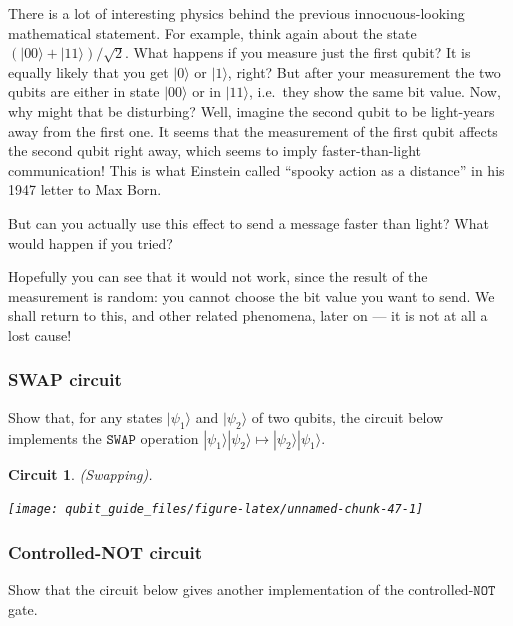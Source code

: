 \documentclass[fleqn,a4paper]{article}
\newtheorem*{circuit}{Circuit}
\theoremstyle{definition}
\theoremstyle{definition}
\theoremstyle{definition}
\theoremstyle{definition}
\theoremstyle{remark}
\begin{document}
There is a lot of interesting physics behind the previous innocuous-looking mathematical statement.
For example, think again about the state \((|00\rangle+|11\rangle)/\sqrt{2}\).
What happens if you measure just the first qubit?
It is equally likely that you get \(|0\rangle\) or \(|1\rangle\), right?
But after your measurement the two qubits are either in state \(|00\rangle\) or in \(|11\rangle\), i.e.~they show the same bit value.
Now, why might that be disturbing?
Well, imagine the second qubit to be light-years away from the first one.
It seems that the measurement of the first qubit affects the second qubit right away, which seems to imply faster-than-light communication!
This is what Einstein called ``spooky action as a distance'' in his 1947 letter to Max Born.

But can you actually use this effect to send a message faster than light?
What would happen if you tried?

Hopefully you can see that it would not work, since the result of the measurement is random: you cannot choose the bit value you want to send.
We shall return to this, and other related phenomena, later on --- it is not at all a lost cause!

\hypertarget{swap-circuit}{%
\subsubsection{SWAP circuit}\label{swap-circuit}}

Show that, for any states \(|\psi_1\rangle\) and \(|\psi_2\rangle\) of two qubits, the circuit below implements the \(\texttt{SWAP}\) operation \(|\psi_1\rangle|\psi_2\rangle \mapsto |\psi_2\rangle|\psi_1\rangle\).

\begin{circuit}

\emph{(Swapping).}

\begin{center}\texttt{[image: qubit\_guide\_files/figure-latex/unnamed-chunk-47-1]} \end{center}

\end{circuit}

\hypertarget{controlled-not-circuit}{%
\subsubsection{Controlled-NOT circuit}\label{controlled-not-circuit}}

Show that the circuit below gives another implementation of the controlled-\(\texttt{NOT}\) gate.
\end{document}
